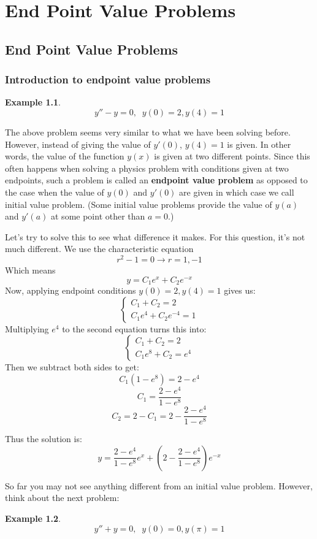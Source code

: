 \documentclass[12pt]{report}
\newtheorem{ex}{Example}[section]
\begin{document}
\chapter{End Point Value Problems}
\section{End Point Value Problems}
\subsection*{Introduction to endpoint value problems }
\begin{ex}
	$$y''-y=0, \; \; y(0)=2,y(4)=1$$
\end{ex}
The above problem seems very similar to what we have been solving before. However, instead of giving the value of $y'(0)$, $y(4)=1$ is given. In other words, the value of the function $y(x)$ is given at two different points. Since this often happens when solving a physics problem with conditions given at two endpoints, such a problem is called an \textbf{endpoint value problem} as opposed to the case when the value of $y(0)$ and $y'(0)$ are given in which case we call initial value problem. (Some initial value problems provide the value of $y(a)$ and $y'(a)$ at some point other than $a=0$.)

Let's try to solve this to see what difference it makes. For this question, it's not much different. We use the characteristic equation
$$r^2-1=0  \rightarrow r=1, -1$$
Which means
$$y= C_1 e^x + C_2 e^{-x}$$
Now, applying endpoint conditions $y(0)=2,y(4)=1$ gives us:
$$\begin{cases} C_1 + C_2 = 2 \\ C_1 e^4 + C_2 e^{-4}=1 \end{cases}$$
Multiplying $e^4$ to the second equation turns this into:
$$\begin{cases} C_1 + C_2 = 2 \\ C_1 e^8 + C_2 =e^{4} \end{cases}$$
Then we subtract both sides to get:
$$C_1 (1-e^8) = 2-e^4$$
$$C_1 = \frac{2-e^4}{1-e^8}$$
$$C_2 = 2- C_1 = 2- \frac{2-e^4}{1-e^8}$$

Thus the solution is:
$$y = \frac{2-e^4}{1-e^8}e^x + \left(2- \frac{2-e^4}{1-e^8} \right)e^{-x}$$

So far you may not see anything different from an initial value problem. However, think about the next problem:

\begin{ex}
$$y''+y=0, \; \; y(0)=0,y(\pi)=1$$
\end{ex}
\end{document}
